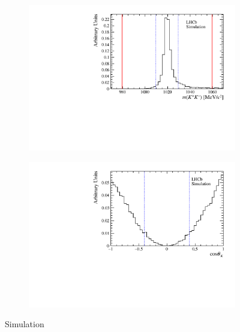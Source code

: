 \begin{figure}[!h]
    \centering
    \begin{subfigure}[t]{0.48\textwidth}
        \centering
        \includegraphics[width=1.0\textwidth]{figs/B2DsPhi/MC_Distributions_mass_B2DsPhi.pdf}
    \end{subfigure}
    \begin{subfigure}[t]{0.48\textwidth}
        \centering
        \includegraphics[width=1.0\textwidth]{figs/B2DsPhi/MC_Distributions_angle_B2DsPhi.pdf}
    \end{subfigure}
    \caption{Simulation}
    \label{fig:B2DsPhi_hel_mass_MC}   
\end{figure}


